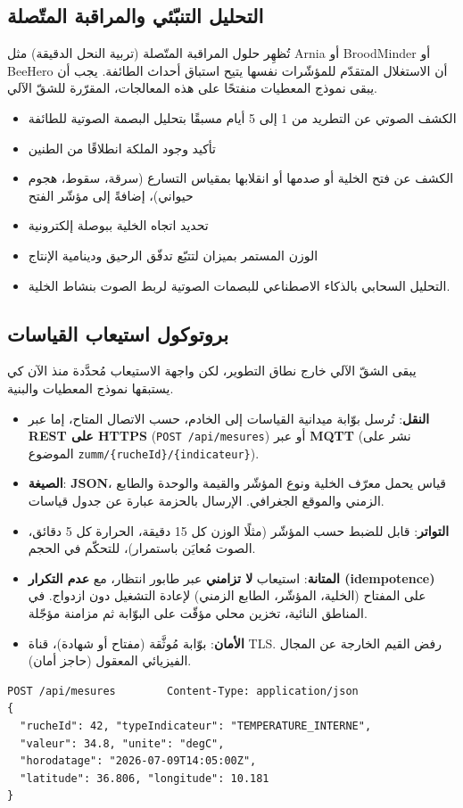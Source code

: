 \subsection{التحليل التنبّئي والمراقبة المتّصلة}
تُظهِر حلول المراقبة المتّصلة (تربية النحل الدقيقة) مثل \textenglish{Arnia} أو
\textenglish{BroodMinder} أو \textenglish{BeeHero} أن الاستغلال المتقدّم
للمؤشّرات نفسها يتيح استباق أحداث الطائفة. يجب أن يبقى نموذج المعطيات منفتحًا على
هذه المعالجات، المقرّرة للشقّ الآلي.
\begin{itemize}
  \item الكشف الصوتي عن التطريد من 1 إلى 5 أيام مسبقًا بتحليل البصمة الصوتية للطائفة
  \item تأكيد وجود الملكة انطلاقًا من الطنين
  \item الكشف عن فتح الخلية أو صدمها أو انقلابها بمقياس التسارع (سرقة، سقوط، هجوم حيواني)، إضافةً إلى مؤشّر الفتح
  \item تحديد اتجاه الخلية ببوصلة إلكترونية
  \item الوزن المستمر بميزان لتتبّع تدفّق الرحيق ودينامية الإنتاج
  \item التحليل السحابي بالذكاء الاصطناعي للبصمات الصوتية لربط الصوت بنشاط الخلية.
\end{itemize}

\subsection{بروتوكول استيعاب القياسات}
يبقى الشقّ الآلي خارج نطاق التطوير، لكن واجهة الاستيعاب مُحدَّدة منذ الآن كي
يستبقها نموذج المعطيات والبنية.
\begin{itemize}
  \item \textbf{النقل}: تُرسل بوّابة ميدانية القياسات إلى الخادم، حسب الاتصال
        المتاح، إما عبر \textbf{REST على HTTPS} (\texttt{POST /api/mesures}) أو
        عبر \textbf{MQTT} (نشر على الموضوع \texttt{zumm/\{rucheId\}/\{indicateur\}}).
  \item \textbf{الصيغة}: \textbf{JSON}، قياس يحمل معرّف الخلية ونوع المؤشّر
        والقيمة والوحدة والطابع الزمني والموقع الجغرافي. الإرسال بالحزمة عبارة عن جدول قياسات.
  \item \textbf{التواتر}: قابل للضبط حسب المؤشّر (مثلًا الوزن كل 15 دقيقة،
        الحرارة كل 5 دقائق، الصوت مُعايَن باستمرار)، للتحكّم في الحجم.
  \item \textbf{المتانة}: استيعاب \textbf{لا تزامني} عبر طابور انتظار، مع
        \textbf{عدم التكرار (idempotence)} على المفتاح (الخلية، المؤشّر، الطابع
        الزمني) لإعادة التشغيل دون ازدواج. في المناطق النائية، تخزين محلي مؤقّت
        على البوّابة ثم مزامنة مؤجّلة.
  \item \textbf{الأمان}: بوّابة مُوثَّقة (مفتاح أو شهادة)، قناة TLS. رفض القيم
        الخارجة عن المجال الفيزيائي المعقول (حاجز أمان).
\end{itemize}
\begin{verbatim}
POST /api/mesures        Content-Type: application/json
{
  "rucheId": 42, "typeIndicateur": "TEMPERATURE_INTERNE",
  "valeur": 34.8, "unite": "degC",
  "horodatage": "2026-07-09T14:05:00Z",
  "latitude": 36.806, "longitude": 10.181
}
\end{verbatim}

